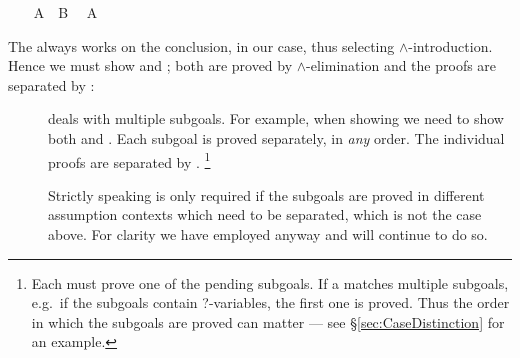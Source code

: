 \begin{isabellebody}
\isacommand{{\isachardot}{\isachardot}}\isanewline
\isamarkupfalse%
\isanewline
\ \ \isamarkupfalse%
\ {\isachardoublequote}A\ {\isasymand}\ B{\isachardoublequote}\ \isamarkupfalse%
\ {\isachardoublequote}A{\isachardoublequote}\ \isamarkupfalse%
\isacommand{{\isachardot}{\isachardot}}\isanewline
\isamarkupfalse%
%
\endisatagproof
{\isafoldproof}%
%
\isadelimproof
%
\endisadelimproof
\isamarkuptrue%
%
\begin{isamarkuptext}%
\noindent The  always works on the conclusion,
 in our case, thus selecting $\land$-introduction. Hence
we must show  and ; both are proved by
$\land$-elimination and the proofs are separated by :
\begin{description}
\item[] deals with multiple subgoals. For example,
when showing  we need to show both  and .  Each subgoal is proved separately, in \emph{any} order. The
individual proofs are separated by .  \footnote{Each
 must prove one of the pending subgoals.  If a
 matches multiple subgoals, e.g.\ if the subgoals
contain ?-variables, the first one is proved. Thus the order in which
the subgoals are proved can matter --- see
\S\ref{sec:CaseDistinction} for an example.}

Strictly speaking  is only required if the subgoals
are proved in different assumption contexts which need to be
separated, which is not the case above. For clarity we
have employed  anyway and will continue to do so.
\end{description}


\end{isamarkuptext}
\end{isabellebody}
